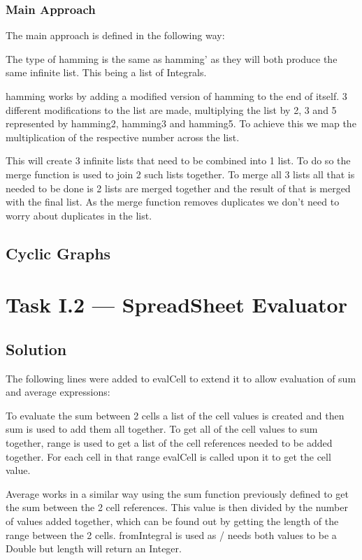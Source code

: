 \documentclass[a4paper]{article}
\begin{document}
\subsubsection{Main Approach}
The main approach is defined in the following way:

\par
The type of hamming is the same as hamming' as they will both produce the same infinite list.
This being a list of Integrals.
\par
hamming works by adding a modified version of hamming to the end of itself.
3 different modifications to the list are made, multiplying the list by 2, 3 and 5 represented by hamming2, hamming3 and hamming5.
To achieve this we map the multiplication of the respective number across the list.
\par
This will create 3 infinite lists that need to be combined into 1 list.
To do so the merge function is used to join 2 such lists together.
To merge all 3 lists all that is needed to be done is 2 lists are merged together and the result of that is merged with the final list.
As the merge function removes duplicates we don't need to worry about duplicates in the list.

\subsection{Cyclic Graphs}

\section{Task I.2 --- SpreadSheet Evaluator}
\subsection{Solution}
The following lines were added to evalCell to extend it to allow evaluation of sum and average expressions:

\par
To evaluate the sum between 2 cells a list of the cell values is created and then sum is used to add them all together.
To get all of the cell values to sum together, range is used to get a list of the cell references needed to be added together.
For each cell in that range evalCell is called upon it to get the cell value.
\medskip
\par
Average works in a similar way using the sum function previously defined to get the sum between the 2 cell references.
This value is then divided by the number of values added together, which can be found out by getting the length of the range between the 2 cells.
fromIntegral is used as / needs both values to be a Double but length will return an Integer.
\end{document}
